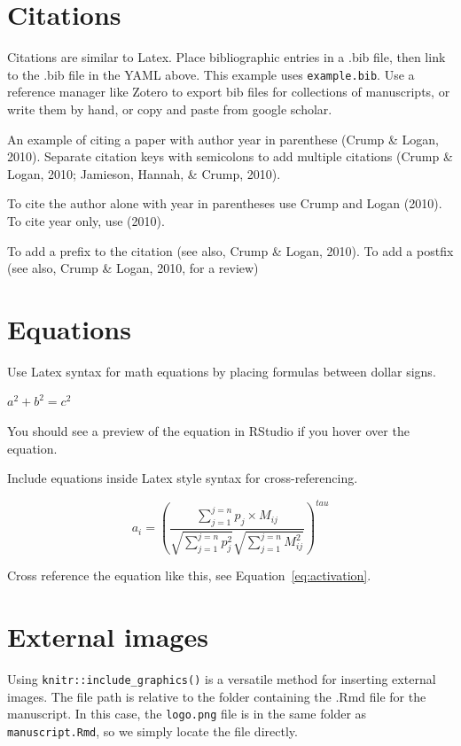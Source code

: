 \documentclass[
  man]{apa6}
\begin{document}
\hypertarget{citations}{%
\section{Citations}\label{citations}}

Citations are similar to Latex. Place bibliographic entries in a .bib file, then link to the .bib file in the YAML above. This example uses \texttt{example.bib}. Use a reference manager like Zotero to export bib files for collections of manuscripts, or write them by hand, or copy and paste from google scholar.

An example of citing a paper with author year in parenthese (Crump \& Logan, 2010). Separate citation keys with semicolons to add multiple citations (Crump \& Logan, 2010; Jamieson, Hannah, \& Crump, 2010).

To cite the author alone with year in parentheses use Crump and Logan (2010). To cite year only, use (2010).

To add a prefix to the citation (see also, Crump \& Logan, 2010). To add a postfix (see also, Crump \& Logan, 2010, for a review)

\hypertarget{equations}{%
\section{Equations}\label{equations}}

Use Latex syntax for math equations by placing formulas between dollar signs.

\(a^2 + b^2 = c^2\)

You should see a preview of the equation in RStudio if you hover over the equation.

Include equations inside Latex style syntax for cross-referencing.

\begin{equation}
a_i = (\frac{\sum_{j=1}^{j=n}p_j \times M_{ij}}{\sqrt{\sum_{j=1}^{j=n}p_j^2}\sqrt{\sum_{j=1}^{j=n}M_{ij}^2}})^{tau}
\label{eq:activation}
\end{equation}

Cross reference the equation like this, see Equation~\eqref{eq:activation}.

\hypertarget{external-images}{%
\section{External images}\label{external-images}}

Using \texttt{knitr::include\_graphics()} is a versatile method for inserting external images. The file path is relative to the folder containing the .Rmd file for the manuscript. In this case, the \texttt{logo.png} file is in the same folder as \texttt{manuscript.Rmd}, so we simply locate the file directly.
\end{document}
